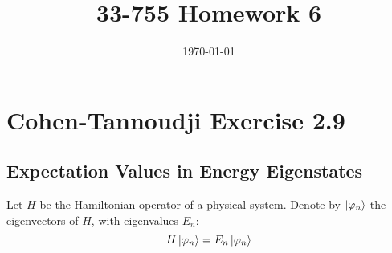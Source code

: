 \documentclass[a4paper,twoside]{article}
\title{33-755 Homework 6}
\date{\today}
\begin{document}
\maketitle

\section*{Cohen-Tannoudji Exercise 2.9}
\subsection*{Expectation Values in Energy Eigenstates}
Let $ H $ be the Hamiltonian operator of a physical system. Denote by $ \ket{\varphi_{n}} $ the eigenvectors of $ H $, with eigenvalues $ E_n $:
\begin{equation}
    H \ket{\varphi_n} = E_n \ket{\varphi_n}
\end{equation}
\end{document}

